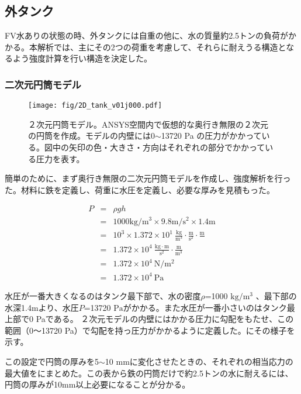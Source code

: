 \subsection{外タンク}
FV水ありの状態の時、外タンクには自重の他に、水の質量約2.5トンの負荷がかかる。本解析では、主にその2つの荷重を考慮して、それらに耐えうる構造となるよう強度計算を行い構造を決定した。

\subsubsection{二次元円筒モデル}

\begin{figure}[htbp]
\centering
\texttt{[image: fig/2D\_tank\_v01j000.pdf]}
\caption[２次元円筒モデル]{２次元円筒モデル。ANSYS空間内で仮想的な奥行き無限の２次元の円筒を作成。モデルの内壁には0$\sim$13720 Pa の圧力がかかっている。図中の矢印の色・大きさ・方向はそれぞれの部分でかかっている圧力を表す。}
\label{Ansys2D}
\end{figure}

簡単のために、まず奥行き無限の二次元円筒モデルを作成し、強度解析を行った。材料に鉄を定義し、荷重に水圧を定義し、必要な厚みを見積もった。

\begin{eqnarray}
P & = & \rho g h\\
& = & 1000 \mathrm{kg/m^{3}} \times 9.8 \mathrm{m/s^{2}} \times 1.4 \mathrm{m}\\
& = & 10^{3} \times 1.372 \times 10^{1}\ \mathrm{\frac{kg}{m^{3}} \cdot \frac{m}{s^{2}} \cdot \frac{m}{}}\\
& = & 1.372 \times 10^{4} \ \mathrm{\frac{kg\cdot m}{s^{2}} \cdot \frac{m}{m^{3}}}\\
& = & 1.372 \times 10^{4} \ \mathrm{N/m^{2}}\\
& = & 1.372 \times 10^{4} \ \mathrm{Pa}
\end{eqnarray}
\fi




水圧が一番大きくなるのはタンク最下部で、水の密度$\rho$=1000 $\mathrm{kg/m^{3}}$ 、最下部の水深1.4mより、水圧$P$=13720 $\mathrm{Pa}$がかかる。また水圧が一番小さいのはタンク最上部で0 Paである。
２次元モデルの内壁にはかかる圧力に勾配をもたせ、この範囲（0〜13720 Pa）で勾配を持っ圧力がかかるように定義した。にその様子を示す。

この設定で円筒の厚みを5$\sim$10 mmに変化させたときの、それぞれの相当応力の最大値をにまとめた。この表から鉄の円筒だけで約2.5トンの水に耐えるには、円筒の厚みが10mm以上必要になることが分かる。

